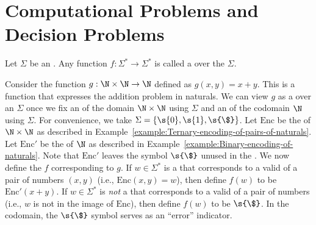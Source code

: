 

\section{Computational Problems and Decision Problems}
\label{section:Computational-Problems-and-Decision-Problems}


\begin{flex}
\begin{definition} \label{definition:Computational-problem}
Let $\Sigma$ be an . Any function $f: \Sigma^* \to \Sigma^*$ is called a  over the  $\Sigma$. 
\end{definition}

\begin{example} \label{example:Addition-as-a-computational-problem}
Consider the function $g:\N \times \N \to \N$ defined as $g(x, y) = x + y$. 
This is a function that expresses the addition problem in naturals. 
We can view $g$ as a  over an  $\Sigma$ once we fix an  of the domain $\N \times \N$ using $\Sigma$ and an  of the codomain $\N$ using $\Sigma$. 
For convenience, we take $\Sigma = \{\s{0},\s{1},\s{\$}\}$. Let $\text{Enc}$ be the  of $\N \times \N$ as described in Example~\ref{example:Ternary-encoding-of-pairs-of-naturals}. 
Let $\text{Enc}'$ be the  of $\N$ as described in Example~\ref{example:Binary-encoding-of-naturals}. 
Note that $\text{Enc}'$ leaves the symbol $\s{\$}$ unused in the . 
We now define the  $f$ corresponding to $g$. 
If $w \in \Sigma^*$ is a  that corresponds to a valid  of a pair of numbers $(x, y)$ (i.e., $\text{Enc}(x,y) = w$), then define $f(w)$ to be $\text{Enc}'(x+y)$. 
If $w \in \Sigma^*$ is \emph{not} a  that corresponds to a valid  of a pair of numbers (i.e., $w$ is not in the image of $\text{Enc}$), then define $f(w)$ to be $\s{\$}$. 
In the codomain, the $\s{\$}$ symbol serves as an ``error'' indicator.
\end{example}
\end{flex}


